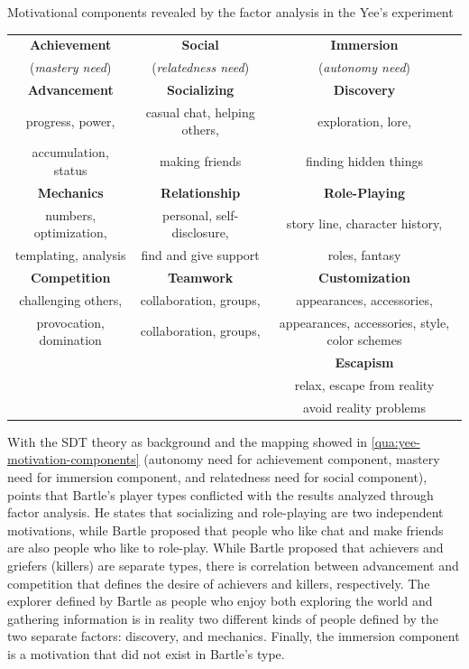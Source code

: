 \begin{quadro}[htb]
\caption{Motivational components revealed by the factor analysis in the Yee's experiment}
\label{qua:yee-motivation-components}
\centering
\scriptsize
\begin{tabular}{|c|c|c|} \hline
\textbf{Achievement} & \textbf{Social} & \textbf{Immersion} \\
(\emph{mastery need}) & (\emph{relatedness need}) & (\emph{autonomy need}) \\ \hline \hline
\textbf{Advancement} & \textbf{Socializing} & \textbf{Discovery} \\
progress, power,  & casual chat, helping others, & exploration, lore, \\
accumulation, status & making friends & finding hidden things \\ \hline
\textbf{Mechanics} & \textbf{Relationship} & \textbf{Role-Playing} \\
numbers, optimization, & personal, self-disclosure, & story line, character history, \\
templating, analysis & find and give support & roles, fantasy \\ \hline
\textbf{Competition} & \textbf{Teamwork} & \textbf{Customization} \\
challenging others, & collaboration, groups, & appearances, accessories, \\
provocation, domination & collaboration, groups, & appearances, accessories, style, color schemes \\ \hline
& & \textbf{Escapism} \\
& & relax, escape from reality \\ 
& & avoid reality problems \\ \hline
\end{tabular}
\end{quadro}

With the SDT theory as background and the mapping showed in \autoref{qua:yee-motivation-components} (autonomy need for achievement component, mastery need for immersion component, and relatedness need for social component),  points that Bartle's player types conflicted with the results analyzed through factor analysis. He states that socializing and role-playing are two independent motivations, while Bartle proposed that people who like chat and make friends are also people who like to role-play. While Bartle proposed that achievers and griefers (killers) are separate types, there is correlation between advancement and competition that defines the desire of achievers and killers, respectively. The explorer defined by Bartle as people who enjoy both exploring the world and gathering information is in reality two different kinds of people defined by the two separate factors: discovery, and mechanics. Finally, the immersion component is a motivation that did not exist in Bartle's type.

